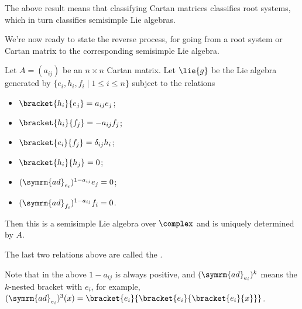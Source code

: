 \documentclass[fleqn]{NotesClass}
\newcommand{\ad}{\symrm{ad}}
\begin{document}
    The above result means that classifying Cartan matrices classifies root systems, which in turn classifies semisimple Lie algebras.
    
    We're now ready to state the reverse process, for going from a root system or Cartan matrix to the corresponding semisimple Lie algebra.
    
    \begin{prp}{}{}
        Let \(A = (a_{ij})\) be an \(n \times n\) Cartan matrix.
        Let \(\lie{g}\) be the Lie algebra generated by \(\{e_i, h_i, f_i \mid 1 \le i \le n\}\) subject to the relations
        \begin{itemize}
            \item \(\bracket{h_i}{e_j} = a_{ij}e_j\);
            \item \(\bracket{h_i}{f_j} = -a_{ij}f_j\);
            \item \(\bracket{e_i}{f_j} = \delta_{ij}h_i\);
            \item \(\bracket{h_i}{h_j} = 0\);
            \item \((\ad_{e_i})^{1 - a_{ij}}e_j = 0\);
            \item \((\ad_{f_i})^{1 - a_{ij}}f_i = 0\).
        \end{itemize}
        Then this is a semisimple Lie algebra over \(\complex\) and is uniquely determined by \(A\).
    \end{prp}
    
    The last two relations above are called the .
    
    Note that in the above \(1 - a_{ij}\) is always positive, and \((\ad_{e_i})^{k}\) means the \(k\)-nested bracket with \(e_i\), for example, \((\ad_{e_i})^{3}(x) = \bracket{e_i}{\bracket{e_i}{\bracket{e_i}{x}}}\).
    
\end{document}
